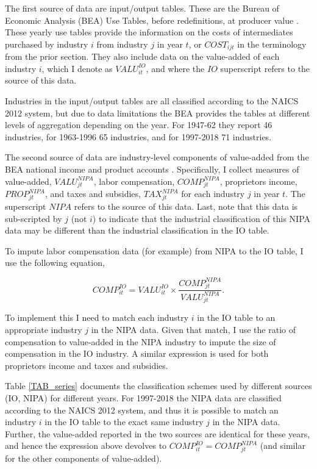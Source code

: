 \documentclass[11pt]{article}
\begin{document}
The first source of data are input/output tables. These are the Bureau of Economic Analysis (BEA) Use Tables, before redefinitions, at producer value \citep{beaio}. These yearly use tables provide the information on the costs of intermediates purchased by industry $i$ from industry $j$ in year $t$, or $COST_{ijt}$ in the terminology from the prior section. They also include data on the value-added of each industry $i$, which I denote as $VALU_{it}^{IO}$, and where the $IO$ superscript refers to the source of this data.

Industries in the input/output tables are all classified according to the NAICS 2012 system, but due to data limitations the BEA provides the tables at different levels of aggregation depending on the year. For 1947-62 they report 46 industries, for 1963-1996 65 industries, and for 1997-2018 71 industries. 

The second source of data are industry-level components of value-added from the BEA national income and product accounts \citep{beasection6,beahistind}. Specifically, I collect measures of value-added, $VALU_{jt}^{NIPA}$, labor compensation, $COMP_{jt}^{NIPA}$, proprietors income, $PROP_{jt}^{NIPA}$, and taxes and subsidies, $TAX_{jt}^{NIPA}$ for each industry $j$ in year $t$. The superscript $NIPA$ refers to the source of this data. Last, note that this data is sub-scripted by $j$ (not $i$) to indicate that the industrial classification of this NIPA data may be different than the industrial classification in the IO table.

To impute labor compensation data (for example) from NIPA to the IO table, I use the following equation,

\begin{equation}
	COMP_{it}^{IO} = VALU_{it}^{IO} \times \frac{COMP_{jt}^{NIPA}}{VALU_{jt}^{NIPA}}. \label{EQ_match}
\end{equation}

To implement this I need to match each industry $i$ in the IO table to an appropriate industry $j$ in the NIPA data. Given that match, I use the ratio of compensation to value-added in the NIPA industry to impute the size of compensation in the IO industry. A similar expression is used for both proprietors income and taxes and subsidies. 

Table \ref{TAB_series} documents the classification schemes used by different sources (IO, NIPA) for different years. For 1997-2018 the NIPA data \citep{beasection6} are classified according to the NAICS 2012 system, and thus it is possible to match an industry $i$ in the IO table to the exact same industry $j$ in the NIPA data. Further, the value-added reported in the two sources are identical for these years, and hence the expression above devolves to $COMP_{it}^{IO} = COMP_{jt}^{NIPA}$ (and similar for the other components of value-added). 
\end{document}
